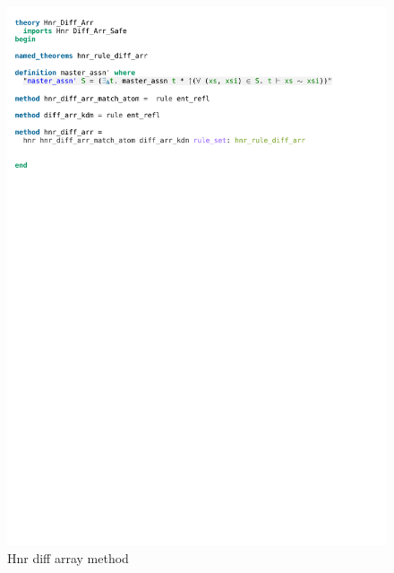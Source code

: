 \begin{figure}[!htpb]
    \includegraphics[trim={0 22,2cm 0 6,6cm}, clip, width=1.00\textwidth]{figures/Theory_Hnr_Diff_Arr_Method.pdf}
    \caption[Hnr diff array method]{Hnr diff array method}
    \label{fig:hnr_diff_arr_method}
\end{figure}
